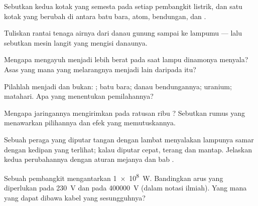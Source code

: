 \begin{exercise}[$\star$]\label{exo:g9:alternator:4}
Sebutkan kedua kotak yang semesta pada setiap pembangkit listrik, dan
satu kotak yang berubah di antara batu bara, atom, bendungan, dan .
\end{exercise}

\begin{exercise}[$\star$]\label{exo:g9:alternator:5}
Tuliskan rantai tenaga airnya dari danau gunung sampai ke lampumu ---
lalu sebutkan mesin langit yang mengisi danaunya.
\end{exercise}

\begin{exercise}[$\star$]\label{exo:g9:alternator:6}
Mengapa mengayuh menjadi lebih berat pada saat lampu dinamonya
menyala? Asas yang mana yang melarangnya menjadi lain daripada itu?
\end{exercise}

\begin{exercise}[$\star$]\label{exo:g9:alternator:7}
Pilahlah menjadi  dan bukan: ; batu bara; danau
bendungannya; uranium;  matahari. Apa yang menentukan
pemilahannya?
\end{exercise}

\begin{exercise}[$\star$]\label{exo:g9:alternator:8}
Mengapa jaringannya mengirimkan  pada ratusan ribu ?
Sebutkan rumus yang menawarkan pilihannya dan efek yang memutuskannya.
\end{exercise}

\begin{exercise}[$\star\star$]\label{exo:g9:alternator:9}
Sebuah  peraga yang diputar tangan dengan lambat menyalakan
lampunya samar dengan kedipan yang terlihat; kalau diputar cepat,
terang dan mantap. Jelaskan kedua perubahannya dengan aturan mejanya
dan bab .
\end{exercise}

\begin{exercise}[$\star\star$]\label{exo:g9:alternator:10}
Sebuah pembangkit mengantarkan \qty{1e8}{W}. Bandingkan arus yang
diperlukan pada \qty{230}{V} dan pada \qty{400000}{V} (dalam notasi
ilmiah). Yang mana yang dapat dibawa kabel yang sesungguhnya?
\end{exercise}

